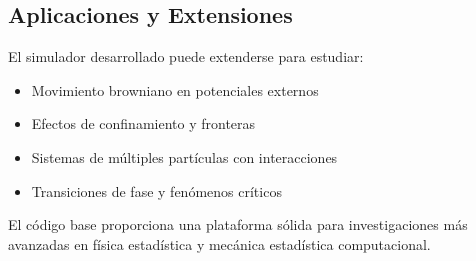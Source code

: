 \documentclass[11pt,a4paper]{article}
\begin{document}
\subsection{Aplicaciones y Extensiones}
El simulador desarrollado puede extenderse para estudiar:
\begin{itemize}
    \item Movimiento browniano en potenciales externos
    \item Efectos de confinamiento y fronteras
    \item Sistemas de múltiples partículas con interacciones
    \item Transiciones de fase y fenómenos críticos
\end{itemize}

El código base proporciona una plataforma sólida para investigaciones más avanzadas en física estadística y mecánica estadística computacional.
\end{document}
